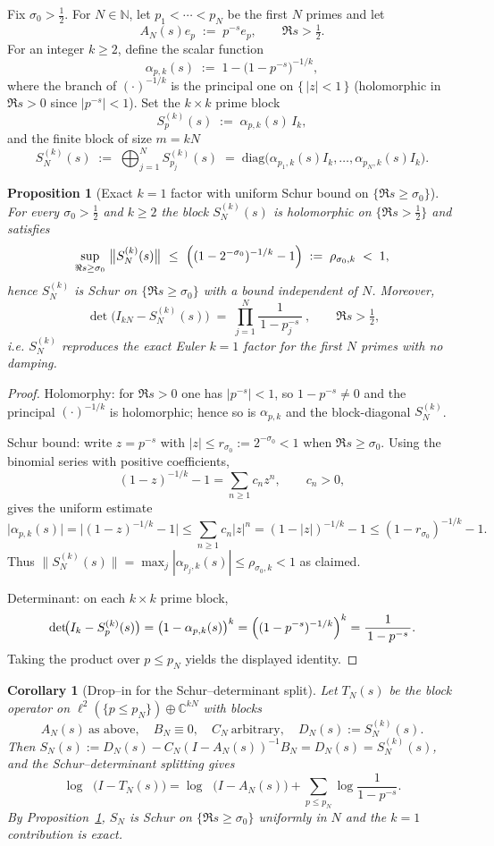 \documentclass[11pt]{article}
\newtheorem{proposition}[theorem]{Proposition}
\newtheorem{corollary}[theorem]{Corollary}
\theoremstyle{definition}
\theoremstyle{remark}
\newcommand{\C}{\mathbb{C}}
\DeclareMathOperator{\dettwo}{det_2}
\begin{document}
Fix $\sigma_0>\tfrac12$. For $N\in\mathbb N$, let $p_1<\cdots<p_N$ be the first $N$ primes and let
\[
 A_N(s)e_p\;:=\;p^{-s}e_p,\qquad \Re s>\tfrac12.
\]
For an integer $k\ge 2$, define the scalar function
\[
 \alpha_{p,k}(s)\;:=\;1-\bigl(1-p^{-s}\bigr)^{-1/k},
\]
where the branch of $(\cdot)^{-1/k}$ is the principal one on $\{\,|z|<1\,\}$ (holomorphic in $\Re s>0$ since $|p^{-s}|<1$). Set the $k\times k$ prime block
\[
 S_p^{(k)}(s)\;:=\;\alpha_{p,k}(s)\,I_k,
\]
and the finite block of size $m=kN$
\[
 \boxed{\quad S_{N}^{(k)}(s)\;:=\;\bigoplus_{j=1}^{N} S_{p_j}^{(k)}(s)\;=\;\mathrm{diag}\bigl(\alpha_{p_1,k}(s)I_k,\dots,\alpha_{p_N,k}(s)I_k\bigr).\quad}
\]

\begin{proposition}[Exact $k=1$ factor with uniform Schur bound on $\{\Re s\ge \sigma_0\}$]
\label{prop:kfold}
For every $\sigma_0>\tfrac12$ and $k\ge 2$ the block $S_{N}^{(k)}(s)$ is holomorphic on $\{\Re s>\tfrac12\}$ and satisfies
\[
 \sup_{\Re s\ge \sigma_0}\ \bigl\|S_{N}^{(k)}(s)\bigr\|\ \le\ \Bigl((1-2^{-\sigma_0})^{-1/k}-1\Bigr)\;:=\;\rho_{\sigma_0,k}\;<\;1,
\]
hence $S_{N}^{(k)}$ is Schur on $\{\Re s\ge \sigma_0\}$ with a bound independent of $N$. Moreover,
\[
 \boxed{\ \det\!\bigl(I_{kN}-S_{N}^{(k)}(s)\bigr)\;=\;\prod_{j=1}^{N}\frac{1}{\,1-p_j^{-s}\,}\ },\qquad \Re s>\tfrac12,
\]
i.e. $S_{N}^{(k)}$ reproduces the exact Euler $k=1$ factor for the first $N$ primes with no damping.
\end{proposition}

\begin{proof}
Holomorphy: for $\Re s>0$ one has $|p^{-s}|<1$, so $1-p^{-s}\neq 0$ and the principal $(\cdot)^{-1/k}$ is holomorphic; hence so is $\alpha_{p,k}$ and the block-diagonal $S_{N}^{(k)}$.

Schur bound: write $z=p^{-s}$ with $|z|\le r_{\sigma_0}:=2^{-\sigma_0}<1$ when $\Re s\ge \sigma_0$. Using the binomial series with positive coefficients,
\[
 (1-z)^{-1/k}-1=\sum_{n\ge 1} c_n z^n,\qquad c_n>0,
\]
gives the uniform estimate
\[
 \bigl|\alpha_{p,k}(s)\bigr|=\bigl|(1-z)^{-1/k}-1\bigr|\le \sum_{n\ge 1} c_n |z|^n
= (1-|z|)^{-1/k}-1 \le (1-r_{\sigma_0})^{-1/k}-1.
\]
Thus $\|S_{N}^{(k)}(s)\|=\max_{j}|\alpha_{p_j,k}(s)|\le \rho_{\sigma_0,k}<1$ as claimed.

Determinant: on each $k\times k$ prime block,
\[
 \det\!\bigl(I_k-S_{p}^{(k)}(s)\bigr)=\bigl(1-\alpha_{p,k}(s)\bigr)^{k}=\Bigl((1-p^{-s})^{-1/k}\Bigr)^{k}=\frac{1}{\,1-p^{-s}\,}.
\]
Taking the product over $p\le p_N$ yields the displayed identity.
\end{proof}
\begin{corollary}[Drop--in for the Schur--determinant split]
\label{cor:dropin}
Let $T_N(s)$ be the block operator on $\ell^2(\{p\le p_N\})\oplus\C^{kN}$ with blocks
\[
 A_N(s)\ \text{as above},\quad B_N\equiv 0,\quad C_N\ \text{arbitrary},\quad D_N(s):=S_{N}^{(k)}(s).
\]
Then $S_N(s):=D_N(s)-C_N(I-A_N(s))^{-1}B_N=D_N(s)=S_{N}^{(k)}(s)$, and the Schur--determinant splitting gives
\[
 \log\dettwo\bigl(I-T_N(s)\bigl)=\log\dettwo\bigl(I-A_N(s)\bigl)+\sum_{p\le p_N}\log\!\frac{1}{1-p^{-s}}.
\]
By Proposition~\ref{prop:kfold}, $S_N$ is Schur on $\{\Re s\ge \sigma_0\}$ uniformly in $N$ and the $k=1$ contribution is exact.
\end{corollary}
\end{document}
